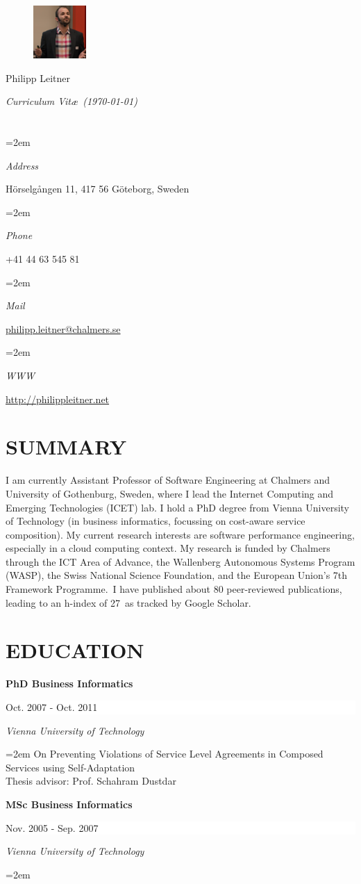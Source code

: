 \documentclass[paper=letter,fontsize=11pt]{scrartcl} %
\newlength{\spacebox}
\newcommand{\sepspace}{\vspace*{1em}}		%
\newcommand{\MyName}[1]{ %
		\Huge \usefont{OT1}{phv}{b}{n} \hfill #1
		\par \normalsize \normalfont}
\newcommand{\MySlogan}[1]{ %
		\large \usefont{OT1}{phv}{m}{n}\hfill \textit{#1}
		\par \normalsize \normalfont}
\newcommand{\NewPart}[2]{\section*{\uppercase{#1} #2}}
\newcommand{\PersonalEntry}[2]{
		\noindent\hangindent=2em\hangafter=0 %
		\parbox{\spacebox}{        %
		\textit{#1}}		       %
		\hspace{1.5em} #2 \par}    %
\newcommand{\EducationEntry}[4]{
		\noindent \textbf{#1} \hfill      %
		\colorbox{White}{%
			\parbox{10em}{%
			\hfill\color{Black}#2}} \par  %
		\noindent \textit{#3} \par        %
		\noindent\hangindent=2em\hangafter=0 \small #4 %
		\normalsize \par}
\begin{document}

\begin{figure}
	\vspace*{-2em}
		\includegraphics[width=0.18\textwidth]{profile.png}
\end{figure}

\MyName{Philipp Leitner}
\MySlogan{Curriculum Vit\ae\ (\today)}

\sepspace

\NewPart{}{}

\PersonalEntry{Address}{Hörselgången 11,
  417 56 Göteborg, Sweden}
\PersonalEntry{Phone}{+41 44 63 545 81}
\PersonalEntry{Mail}{\href{mailto:philipp.leitner@chalmers.se}{philipp.leitner@chalmers.se}}
\PersonalEntry{WWW}{\href{http://philippleitner.net}{http://philippleitner.net}}

\NewPart{Summary}{}
I am currently Assistant Professor of Software Engineering at Chalmers and University of Gothenburg, Sweden, where I lead the Internet Computing and Emerging Technologies (ICET) lab. I hold a PhD degree from Vienna University of Technology (in business informatics, focussing on cost-aware service composition). My current research interests are software performance engineering, especially in a cloud computing context. My research is funded by Chalmers through the ICT Area of Advance, the Wallenberg Autonomous Systems Program (WASP), the Swiss National Science Foundation, and the European Union's 7th Framework Programme. I have published about 80 peer-reviewed publications, leading to an h-index of 27 as tracked by Google Scholar.


\NewPart{Education}{}

\EducationEntry{PhD Business Informatics}{Oct. 2007 - Oct. 2011}{Vienna
University of Technology}{On Preventing Violations of Service Level Agreements in Composed Services using Self-Adaptation\\
Thesis advisor: Prof. Schahram Dustdar}
\sepspace

\EducationEntry{MSc Business Informatics}{Nov. 2005 - Sep. 2007}{Vienna
University of Technology}{}
\end{document}
